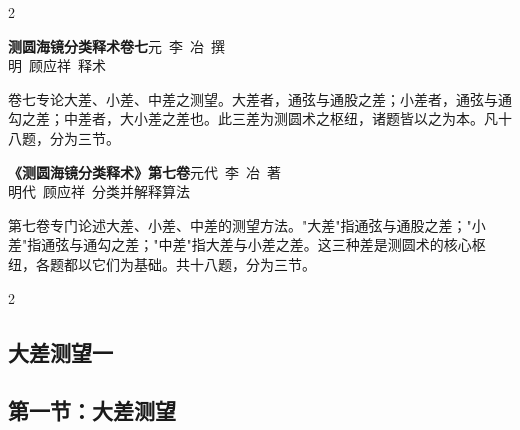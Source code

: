 \documentclass[11pt,a4paper]{article}
\begin{document}
\begin{paracol}{2}

\switchcolumn*
\begin{center}
\noindent\textbf{测圆海镜分类释术卷七}\quad 元~李~冶~撰\\
明~顾应祥~释术
\end{center}

\vspace{0.5em}
\noindent
卷七专论大差、小差、中差之测望。大差者，通弦与通股之差；小差者，通弦与通勾之差；中差者，大小差之差也。此三差为测圆术之枢纽，诸题皆以之为本。凡十八题，分为三节。

\switchcolumn
\begin{center}
\noindent\textbf{《测圆海镜分类释术》第七卷}\quad 元代~李~冶~著\\
明代~顾应祥~分类并解释算法
\end{center}

\vspace{0.5em}
\noindent
第七卷专门论述大差、小差、中差的测望方法。"大差"指通弦与通股之差；"小差"指通弦与通勾之差；"中差"指大差与小差之差。这三种差是测圆术的核心枢纽，各题都以它们为基础。共十八题，分为三节。

\end{paracol}

\vspace{0.5em}

\begin{paracol}{2}
\subsection*{\textcolor{sectioncolor}{大差测望一}}
\switchcolumn
\subsection*{\textcolor{sectioncolor}{第一节：大差测望}}
\end{paracol}

\vspace{0.5em}
\end{document}
